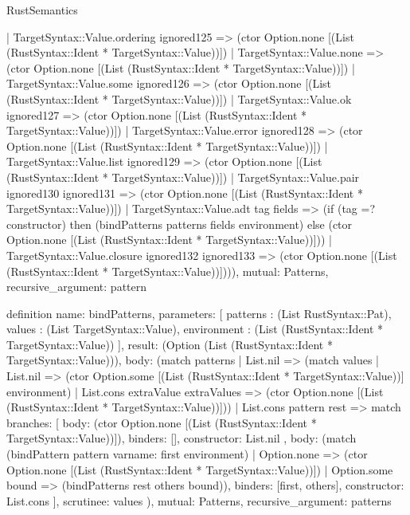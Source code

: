 \begin{lexlean}{RustSemantics}
\begin{semanticmodule}
{      | TargetSyntax::Value.ordering ignored125 => (ctor Option.none [(List (RustSyntax::Ident * TargetSyntax::Value))])
      | TargetSyntax::Value.none => (ctor Option.none [(List (RustSyntax::Ident * TargetSyntax::Value))])
      | TargetSyntax::Value.some ignored126 => (ctor Option.none [(List (RustSyntax::Ident * TargetSyntax::Value))])
      | TargetSyntax::Value.ok ignored127 => (ctor Option.none [(List (RustSyntax::Ident * TargetSyntax::Value))])
      | TargetSyntax::Value.error ignored128 => (ctor Option.none [(List (RustSyntax::Ident * TargetSyntax::Value))])
      | TargetSyntax::Value.list ignored129 => (ctor Option.none [(List (RustSyntax::Ident * TargetSyntax::Value))])
      | TargetSyntax::Value.pair ignored130 ignored131 => (ctor Option.none [(List (RustSyntax::Ident * TargetSyntax::Value))])
      | TargetSyntax::Value.adt tag fields => (if (tag =? constructor) then (bindPatterns patterns fields environment) else (ctor Option.none [(List (RustSyntax::Ident * TargetSyntax::Value))]))
      | TargetSyntax::Value.closure ignored132 ignored133 => (ctor Option.none [(List (RustSyntax::Ident * TargetSyntax::Value))]))),
  mutual: Patterns,
  recursive_argument: pattern
}

definition{
  name: bindPatterns,
  parameters: [
    patterns : (List RustSyntax::Pat),
    values : (List TargetSyntax::Value),
    environment : (List (RustSyntax::Ident * TargetSyntax::Value))
  ],
  result: (Option (List (RustSyntax::Ident * TargetSyntax::Value))),
  body: (match patterns
    | List.nil => (match values
      | List.nil => (ctor Option.some [(List (RustSyntax::Ident * TargetSyntax::Value))] environment)
      | List.cons extraValue extraValues => (ctor Option.none [(List (RustSyntax::Ident * TargetSyntax::Value))]))
    | List.cons pattern rest => match{
      branches: [
        {
          body: (ctor Option.none [(List (RustSyntax::Ident * TargetSyntax::Value))]),
          binders: [],
          constructor: List.nil
        },
        {
          body: (match (bindPattern pattern var{name: first} environment)
            | Option.none => (ctor Option.none [(List (RustSyntax::Ident * TargetSyntax::Value))])
            | Option.some bound => (bindPatterns rest others bound)),
          binders: [first, others],
          constructor: List.cons
        }
      ],
      scrutinee: values
    }),
  mutual: Patterns,
  recursive_argument: patterns
}


\end{semanticmodule}
\end{lexlean}
